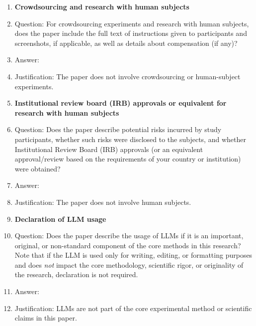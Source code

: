 \begin{enumerate}[leftmargin=*]
\item \textbf{Crowdsourcing and research with human subjects}
\item[] Question: For crowdsourcing experiments and research with human subjects, does the paper include the full text of instructions given to participants and screenshots, if applicable, as well as details about compensation (if any)?
\item[] Answer: \answerNA{}
\item[] Justification: The paper does not involve crowdsourcing or human-subject experiments.

\item \textbf{Institutional review board (IRB) approvals or equivalent for research with human subjects}
\item[] Question: Does the paper describe potential risks incurred by study participants, whether such risks were disclosed to the subjects, and whether Institutional Review Board (IRB) approvals (or an equivalent approval/review based on the requirements of your country or institution) were obtained?
\item[] Answer: \answerNA{}
\item[] Justification: The paper does not involve human subjects.

\item \textbf{Declaration of LLM usage}
\item[] Question: Does the paper describe the usage of LLMs if it is an important, original, or non-standard component of the core methods in this research? Note that if the LLM is used only for writing, editing, or formatting purposes and does \emph{not} impact the core methodology, scientific rigor, or originality of the research, declaration is not required.
\item[] Answer: \answerNA{}
\item[] Justification: LLMs are not part of the core experimental method or scientific claims in this paper.
\end{enumerate}
